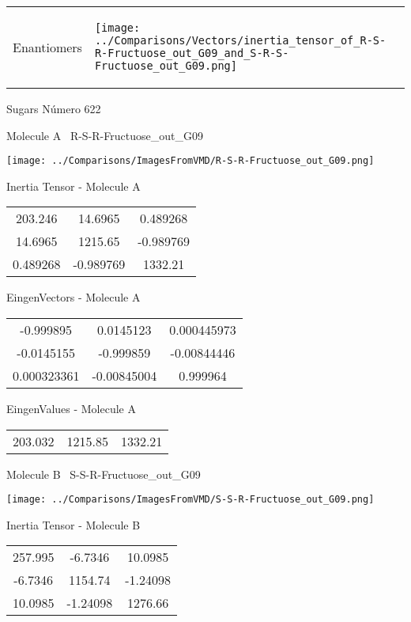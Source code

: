 \vtab[-5mm]
\begin{tabular}{*{2}{m{}}}
\begin{center}
\textcolor{NavyBlue}{\Large Enantiomers}
\end{center}
&
\begin{center}
\texttt{[image: ../Comparisons/Vectors/inertia\_tensor\_of\_R-S-R-Fructuose\_out\_G09\_and\_S-R-S-Fructuose\_out\_G09.png]}
\end{center}
\end{tabular}

 \newpage

\vtab[-3cm]
\begin{center}
{\large Sugars \tab Número 622}
\end{center}
\begin{multicols}{2}
\begin{center}

Molecule A \
R-S-R-Fructuose\_out\_G09

\texttt{[image: ../Comparisons/ImagesFromVMD/R-S-R-Fructuose\_out\_G09.png]}

Inertia Tensor - Molecule A \\
\begin{tabular}{|c c c|}
203.246	 & 	14.6965	 & 	0.489268	 \\
14.6965	 & 	1215.65	 & 	-0.989769	 \\
0.489268	 & 	-0.989769	 & 	1332.21
\end{tabular}

\vtab
 EingenVectors - Molecule A     \\
\begin{tabular}{|c c c|}
-0.999895	 & 	0.0145123	 & 	0.000445973	 \\
-0.0145155	 & 	-0.999859	 & 	-0.00844446	 \\
0.000323361	 & 	-0.00845004	 & 	0.999964
\end{tabular}

\vtab
 EingenValues - Molecule A     \\
\begin{tabular}{|c c c|}
203.032	 & 	1215.85	 & 	1332.21	 \\
\end{tabular}
\columnbreak

Molecule B \
S-S-R-Fructuose\_out\_G09

\texttt{[image: ../Comparisons/ImagesFromVMD/S-S-R-Fructuose\_out\_G09.png]}

Inertia Tensor - Molecule B \\
\begin{tabular}{|c c c|}
257.995	 & 	-6.7346	 & 	10.0985	 \\
-6.7346	 & 	1154.74	 & 	-1.24098	 \\
10.0985	 & 	-1.24098	 & 	1276.66
\end{tabular}


\end{center}
\end{multicols}
